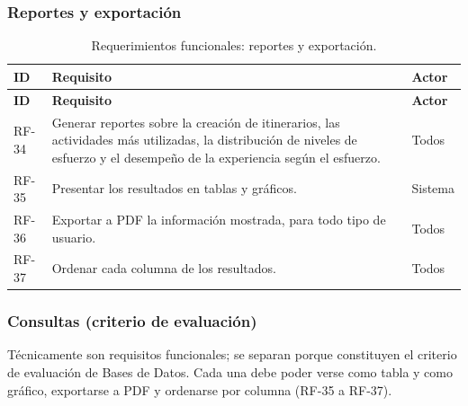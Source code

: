 \documentclass[11pt,a4paper]{article}
\begin{document}
\subsubsection{Reportes y exportación}
{\footnotesize\setlength{\tabcolsep}{3pt}\renewcommand{\arraystretch}{1.15}
\begin{longtable}{|>{\raggedright\arraybackslash}p{1.28cm}|>{\raggedright\arraybackslash}p{11.28cm}|>{\raggedright\arraybackslash}p{2.98cm}|}
\caption{Requerimientos funcionales: reportes y exportación.}\label{tab:rf-reportes}\\ \hline
\rowcolor{gray!20} \textbf{ID} & \textbf{Requisito} & \textbf{Actor} \\ \hline
\endfirsthead
\hline \rowcolor{gray!20} \textbf{ID} & \textbf{Requisito} & \textbf{Actor} \\ \hline
\endhead
RF-34 & Generar reportes sobre la creación de itinerarios, las actividades más utilizadas, la distribución de niveles de esfuerzo y el desempeño de la experiencia según el esfuerzo. & Todos \\ \hline
RF-35 & Presentar los resultados en tablas y gráficos. & Sistema \\ \hline
RF-36 & Exportar a PDF la información mostrada, para todo tipo de usuario. & Todos \\ \hline
RF-37 & Ordenar cada columna de los resultados. & Todos \\ \hline
\end{longtable}}
\vspace{2pt}
\subsubsection{Consultas (criterio de evaluación)}
Técnicamente son requisitos funcionales; se separan porque constituyen el criterio de evaluación de Bases de Datos. Cada una debe poder verse como tabla y como gráfico, exportarse a PDF y ordenarse por columna (RF-35 a RF-37).
\end{document}

